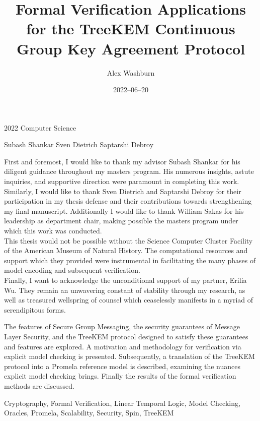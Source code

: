 %
\title%
           {Formal Verification Applications for the TreeKEM Continuous Group Key Agreement Protocol}
\date%
           {2022--06--20}
\annum%
           {2022}
\department%
           {Computer Science}

\author%
           {Alex Washburn}
\advisor%
           {Subash Shankar}
\reader%
           {Sven Dietrich}
\director%
           {Saptarshi Debroy}

\dedication%
{
This work is dedicated to future generations, with the hope that they experience secure communication which is intuitively usable, inveterately ubiquitous, and indelibly unrestricted.
}

\acknowledge%
{
First and foremost, I would like to thank my advisor Subash Shankar for his diligent guidance throughout my masters program.
His numerous insights, astute inquiries, and supportive direction were paramount in completing this work.
Similarly, I would like to thank Sven Dietrich and Saptarshi Debroy for their participation in my thesis defense and their contributions towards strengthening my final manuscript.
Additionally I would like to thank William Sakas for his leadership as department chair, making possible the masters program under which this work was conducted.\\
This thesis would not be possible without the Science Computer Cluster Facility of the American Museum of Natural History.
The computational resources and support which they provided were instrumental in facilitating the many phases of model encoding and subsequent verification.\\
Finally, I want to acknowledge the unconditional support of my partner, Erilia Wu. 
They remain an unwavering constant of stability through my research, as well as treasured wellspring of counsel which ceaselessly manifests in a myriad of serendipitous forms.
}

\abstract%
{
The features of Secure Group Messaging, the security guarantees of Message Layer Security, and the TreeKEM protocol designed to satisfy these guarantees and features are explored.
A motivation and methodology for verification via explicit model checking is presented.
Subsequently, a translation of the TreeKEM protocol into a Promela reference model is described, examining the nuances explicit model checking brings.
Finally the results of the formal verification methods are discussed.
}

\keywords%
{
Cryptography,
Formal Verification,
Linear Temporal Logic,
Model Checking,
Oracles,
Promela,
Scalability,
Security,
Spin,
TreeKEM
}
